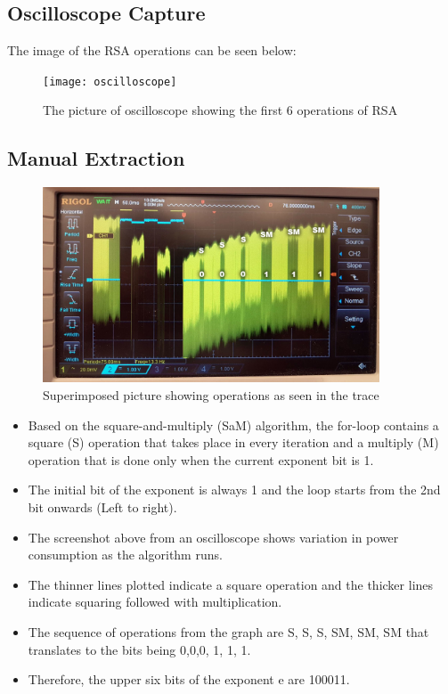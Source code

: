 \documentclass[1p,16pt]{elsarticle}
\begin{document}
\subsection{Oscilloscope Capture}%
\label{sub:oscilloscope_capture}
The image of the RSA operations can be seen below:
\begin{figure}[H]
	\centering
    \centerline{\texttt{[image: oscilloscope]}}
    \caption{The picture of oscilloscope showing the first 6 operations of RSA}\label{fig:oscilloscope}
\end{figure}

\subsection{Manual Extraction}%
\label{sub:manual_extraction}

\begin{figure}[H]
	\centering
    \centerline{\includegraphics[width=10cm]{manual_extraction}}
    \caption{Superimposed picture showing operations as seen in the trace}\label{fig:manual_extraction}
\end{figure}
\begin{itemize}

\item Based on the square-and-multiply (SaM) algorithm, the for-loop contains a square (S) operation that takes place in every iteration and a multiply (M) operation that is done only when the current exponent bit is 1.

\item The initial bit of the exponent is always 1 and the loop starts from the 2nd bit onwards (Left to right).

\item The screenshot above from an oscilloscope shows variation in power consumption as the algorithm runs.

\item The thinner lines plotted indicate a square operation and the thicker lines indicate squaring followed with multiplication.

\item The sequence of operations from the graph are S, S, S, SM, SM, SM that translates to the bits being 0,0,0, 1, 1, 1.

\item Therefore, the upper six bits of the exponent e are 100011.

\end{itemize}
\end{document}
